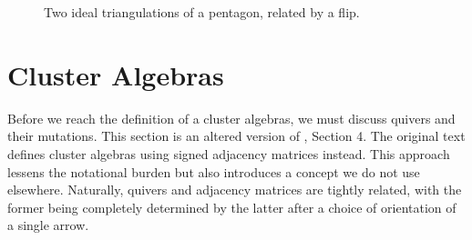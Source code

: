 \documentclass[a4paper,oneside,svgnames]{amsart}
\theoremstyle{plain}
\theoremstyle{definition}
\begin{document}
 \begin{figure}[ht]
  \centering
  \begin{subfigure}{.3\textwidth}
   \centering
  \end{subfigure}
  \begin{subfigure}{.3\textwidth}
   \centering
  \end{subfigure}
  \caption{Two ideal triangulations of a pentagon, related by a flip.}
  \label{fig:flip-pentagon}
 \end{figure}

 \section{Cluster Algebras}
 \label{sec:cluster-algebras}

 Before we reach the definition of a cluster algebras, we must discuss quivers
 and their mutations. This section is an altered version of \cite{ot}, Section
 4. The original text defines cluster algebras using signed adjacency matrices
 instead. This approach lessens the notational burden but also introduces a
 concept we do not use elsewhere. Naturally, quivers and adjacency matrices are
 tightly related, with the former being completely determined by the latter
 after a choice of orientation of a single arrow.
\end{document}
